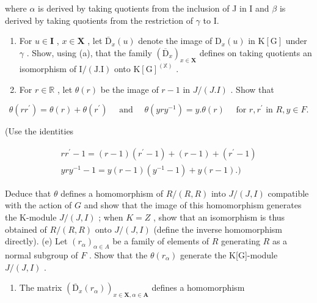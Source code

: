 where \(\alpha\) is derived by taking quotients from the inclusion of J in I and \(\beta\) is derived by taking quotients from the restriction of \(\gamma\) to I.

\begin{enumerate}
\def\labelenumi{(\alph{enumi})}
\setcounter{enumi}{2}
\item
  For \(u \in \mathbf{I}\) , \(x \in \mathbf{X}\) , let \(\overline{\mathrm{D}}_x(u)\) denote the image of \(\mathrm{D}_x(u)\) in \(\mathrm{K}[\mathrm{G}]\) under \(\gamma\) . Show, using (a), that the family \((\overline{\mathrm{D}}_x)_{x \in \mathbf{X}}\) defines on taking quotients an isomorphism of \(\mathrm{I} / (\mathrm{J}. \mathrm{I})\) onto \(\mathrm{K}[\mathrm{G}]^{(\mathbb{X})}\) .
\item
  For \(r \in \mathbb{R}\) , let \(\theta(r)\) be the image of \(r - 1\) in \(J/(J.I)\) . Show that
\end{enumerate}

\[
\theta (r r ^ {\prime}) = \theta (r) + \theta (r ^ {\prime}) \quad \text { and } \quad \theta (y r y ^ {- 1}) = y. \theta (r) \quad \text { for   } r, r ^ {\prime} \text {   in   } R, y \in F.
\]

(Use the identities

\[
\begin{array}{c} {r r ^ {\prime} - 1 = (r - 1) (r ^ {\prime} - 1) + (r - 1) + (r ^ {\prime} - 1)} \\ {y r y ^ {- 1} - 1 = y (r - 1) (y ^ {- 1} - 1) + y (r - 1).)} \end{array}
\]

Deduce that \(\theta\) defines a homomorphism of \(R/(R, R)\) into \(J/(J, I)\) compatible with the action of \(G\) and show that the image of this homomorphism generates the K-module \(J/(J, I)\) ; when \(K = Z\) , show that an isomorphism is thus obtained of \(R/(R, R)\) onto \(J/(J, I)\) (define the inverse homomorphism directly). (e) Let \((r_{\alpha})_{\alpha \in A}\) be a family of elements of \(R\) generating \(R\) as a normal subgroup of \(F\) . Show that the \(\theta(r_{\alpha})\) generate the K{[}G{]}-module \(J/(J, I)\) .

\begin{enumerate}
\def\labelenumi{(\alph{enumi})}
\setcounter{enumi}{5}
\tightlist
\item
  The matrix \((\overline{\mathrm{D}}_x(r_\alpha))_{x\in \mathbf{X},\alpha \in \mathbf{A}}\) defines a homomorphism
\end{enumerate}

